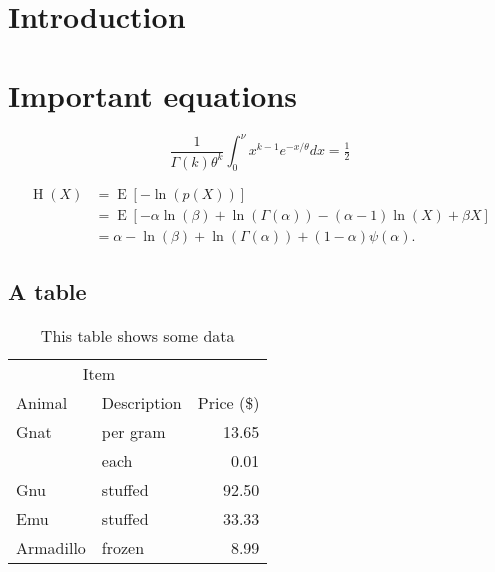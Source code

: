 \documentclass[12pt, a4paper, twoside]{article}%
\title{\mytitle}
\author{Tommy O.}
\numberwithin{equation}{section}
\begin{document}
\maketitle
\pagestyle{fancy}
\begin{abstract}
\noindent \blindtext
\end{abstract}
\tableofcontents


\section{Introduction}
\blindtext

\section{Important equations}
\blindtext

\begin{equation}
	\frac{1}{\Gamma(k) \theta^k} \int_0^\nu x^{k - 1} e^{-x/\theta} dx = \tfrac{1}{2}
\end{equation}

\blindtext

\begin{align}
\operatorname{H}(X) & = \operatorname{E}[-\ln(p(X))] \\
& = \operatorname{E}[-\alpha \ln(\beta) + \ln(\Gamma(\alpha)) - (\alpha-1)\ln(X) + \beta X] \\
& = \alpha - \ln(\beta) + \ln(\Gamma(\alpha)) + (1-\alpha)\psi(\alpha).
\end{align}

\subsection{A table}
\blindtext

\begin{table}[ht!]
	\centering
	\caption{This table shows some data}
	\begin{tabular}{llr}  
		\toprule
		\multicolumn{2}{c}{Item} \\
		\cmidrule(r){1-2}
		Animal    & Description & Price (\$) \\
		\midrule
		Gnat      & per gram    & 13.65      \\
		&    each     & 0.01       \\
		Gnu       & stuffed     & 92.50      \\
		Emu       & stuffed     & 33.33      \\
		Armadillo & frozen      & 8.99       \\
		\bottomrule
	\end{tabular}
	
	\label{tab:myfirsttable}
\end{table}
\blindtext
\end{document}
